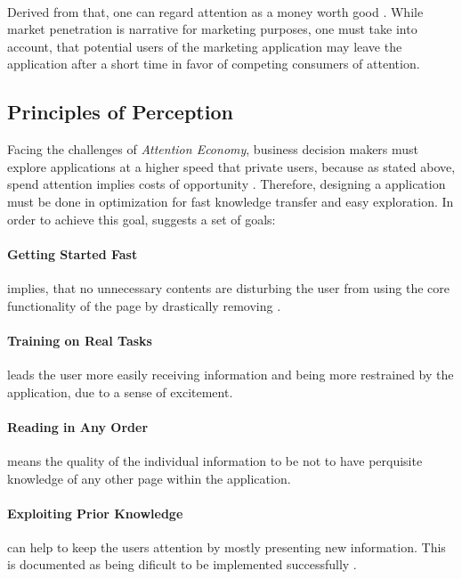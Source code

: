 \paragraph*{} Derived from that, one can regard attention as a money worth good \parencite[see.][]{Davenport.2001}. While market penetration is narrative for marketing purposes, one must take into account, that potential users of the marketing application may leave the application after a short time in favor of competing consumers of attention.
\subsection{Principles of Perception}
Facing the challenges of \textit{Attention Economy}, business decision makers must explore applications at a higher speed that private users, because as stated above, spend attention implies costs of opportunity \parencite[see.][]{Bakar.2017}. Therefore, designing a application must be done in optimization for fast knowledge transfer and easy exploration. In order to achieve this goal, \textcite{Bakar.2017} suggests a set of goals:
\paragraph*{Getting Started Fast} implies, that no unnecessary contents are disturbing the user from using the core functionality of the page by drastically removing   \parencite{Bakar.2017}. 
\paragraph*{Training on Real Tasks} leads the user more easily receiving information and being more restrained by the application, due to a sense of excitement.
\paragraph*{Reading in Any Order} means the quality of the individual information to be not to have perquisite knowledge of any other page within the application.
\paragraph*{Exploiting Prior Knowledge} can help to keep the users attention by mostly presenting new information. This is documented as being dificult to be implemented successfully .
